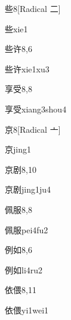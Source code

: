 \begin{entry}{些}{8}[Radical 二]
  \begin{phonetics}{些}{xie1}
  \end{phonetics}
\end{entry}

\begin{entry}{些许}{8,6}
  \begin{phonetics}{些许}{xie1xu3}
  \end{phonetics}
\end{entry}

\begin{entry}{享受}{8,8}
  \begin{phonetics}{享受}{xiang3shou4}
  \end{phonetics}
\end{entry}

\begin{entry}{京}{8}[Radical 亠]
  \begin{phonetics}{京}{jing1}
  \end{phonetics}
\end{entry}

\begin{entry}{京剧}{8,10}
  \begin{phonetics}{京剧}{jing1ju4}
  \end{phonetics}
\end{entry}

\begin{entry}{佩服}{8,8}
  \begin{phonetics}{佩服}{pei4fu2}
  \end{phonetics}
\end{entry}

\begin{entry}{例如}{8,6}
  \begin{phonetics}{例如}{li4ru2}
  \end{phonetics}
\end{entry}

\begin{entry}{依偎}{8,11}
  \begin{phonetics}{依偎}{yi1wei1}
  \end{phonetics}
\end{entry}


